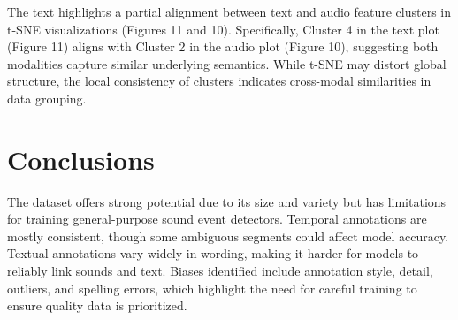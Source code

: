 \documentclass{article}
\begin{document}
The text highlights a partial alignment between text and audio feature clusters in t-SNE visualizations (Figures 11 and 10). Specifically, Cluster 4 in the text plot (Figure 11) aligns with Cluster 2 in the audio plot (Figure 10), suggesting both modalities capture similar underlying semantics. While t-SNE may distort global structure, the local consistency of clusters indicates cross-modal similarities in data grouping.

\section{Conclusions}
\label{sec:conclusions}

The dataset offers strong potential due to its size and variety but has limitations for training general-purpose sound event detectors. Temporal annotations are mostly consistent, though some ambiguous segments could affect model accuracy. Textual annotations vary widely in wording, making it harder for models to reliably link sounds and text. Biases identified include annotation style, detail, outliers, and spelling errors, which highlight the need for careful training to ensure quality data is prioritized.
\end{document}
